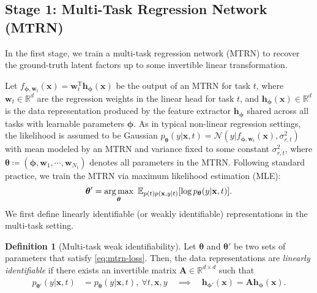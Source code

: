 \documentclass{article} %
\theoremstyle{plain}
\theoremstyle{definition}
\newtheorem{definition}[theorem]{Definition}
\theoremstyle{remark}
\begin{document}
\subsection{Stage 1: Multi-Task Regression Network (MTRN)}
\vspace{-1ex}
In the first stage, we train a multi-task regression network (MTRN) to recover the ground-truth latent factors up to some invertible linear transformation. 

Let $f_{\boldsymbol{\phi},\mathbf{w}_t}(\mathbf{x})=\mathbf{w}_t^{\text{T}}\mathbf{h}_{\boldsymbol{\phi}}(\mathbf{x})$ be the output of an MTRN for task $t$, 
where $\mathbf{w}_t\in\mathbb{R}^{d}$ are the regression weights in the linear head for task $t$, and $\mathbf{h}_{\boldsymbol{\phi}}(\mathbf{x})\in\mathbb{R}^{d}$ is the data representation produced by the feature extractor $\mathbf{h}_{\boldsymbol{\phi}}$ shared across all tasks with learnable parameters $\boldsymbol{\phi}$.
As in typical non-linear regression settings, the likelihood is assumed to be Gaussian $p_{\boldsymbol{\theta}}(y|\mathbf{x},t)=\mathcal{N}(y|f_{\boldsymbol{\phi},\mathbf{w}_t}(\mathbf{x}),\sigma_{r,t}^2)$ with mean modeled by an MTRN and variance fixed to some constant $\sigma_{r,t}^2$, where $\boldsymbol{\theta}\coloneqq(\boldsymbol{\phi},\mathbf{w}_1,\cdots,\mathbf{w}_{N_t})$ denotes all parameters in the MTRN. Following standard practice, we train the MTRN via maximum likelihood estimation (MLE):
\begin{align}\label{eq:mtrn-loss} 
\boldsymbol{\theta}'=\operatorname*{arg\,max}_{\boldsymbol{\theta}}~\mathbb{E}_{p(t)p(\mathbf{x},y|t)}[\log p_{\boldsymbol{\theta}}(y|\mathbf{x},t)].
\end{align}
We first define linearly identifiable (or weakly identifiable) representations in the multi-task setting.
\begin{definition}[Multi-task weak identifiability]\label{def:weak-id}
    Let $\boldsymbol{\theta}$ and $\boldsymbol{\theta}'$ be two sets of parameters that satisfy \eqref{eq:mtrn-loss}. Then, the data representations are \textit{linearly identifiable} if there exists an invertible matrix $\mathbf{A}\in\mathbb{R}^{d\times d}$ such that
    \begin{align}
            p_{\boldsymbol{\theta}'}(y|\mathbf{x},t)&=p_{\boldsymbol{\theta}}(y|\mathbf{x},t),~\forall t,\mathbf{x},y 
            \quad\implies\quad
            \mathbf{h}_{\boldsymbol{\phi}'}(\mathbf{x})=\mathbf{A}\mathbf{h}_{\boldsymbol{\phi}}(\mathbf{x}).
    \end{align}
\end{definition}
\end{document}
